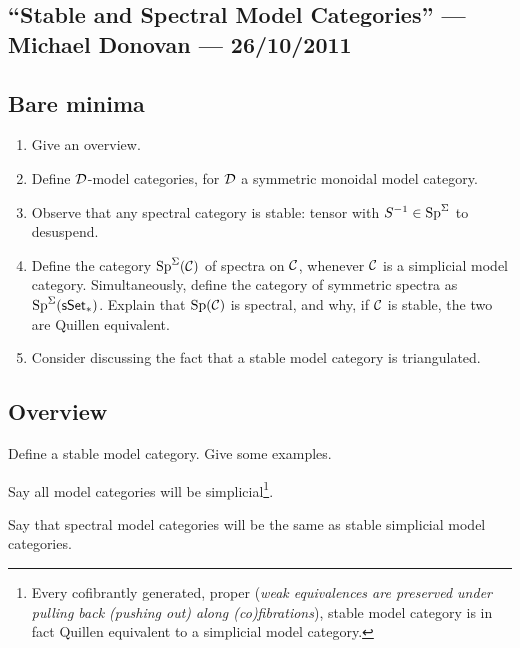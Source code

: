 \documentclass[11pt]{article}
\newcommand{\KanSemResponse}[1]
{
\thispagestyle{fancy}
\subsection*{#1}
}
\begin{document}
\begin{MichaelStableModelCats}
\KanSemResponse
{``Stable and Spectral Model Categories'' --- Michael Donovan --- 26/10/2011}

\subsection*{Bare minima}
\begin{enumerate}\squishlist
\item Give an overview.
\item Define $\mathcal{D}$-model categories, for $\mathcal{D}$ a symmetric monoidal model category.
\item Observe that any spectral category is stable: tensor with $S^{-1}\in\operatorname{Sp}^\Sigma$ to desuspend.

\item Define the category $\operatorname{Sp}^\Sigma(\mathcal{C})$ of spectra on $\mathcal{C}$, whenever $\mathcal{C}$ is a simplicial model category.
Simultaneously, define the category of symmetric spectra as $\operatorname{Sp}^\Sigma(\operatorname{{\mathsf{sSet}}}_*)$.
Explain that $\operatorname{Sp}(\mathcal{C})$ is spectral, and why, if $\mathcal{C}$ is stable, the two are Quillen equivalent.
\item Consider discussing the fact that a stable model category is triangulated.
\end{enumerate}

\subsection{Overview}
\begin{itemise}
\item Define a stable model category. Give some examples.
\item Say all model categories will be simplicial\footnote{Every cofibrantly generated, proper (\textit{weak equivalences are preserved under pulling back (pushing out) along (co)fibrations}), stable model category is in fact Quillen equivalent to a simplicial model category.}. 
\item Say that spectral model categories will be the same as stable simplicial model categories.
\end{itemise}



\end{MichaelStableModelCats}
\end{document}
